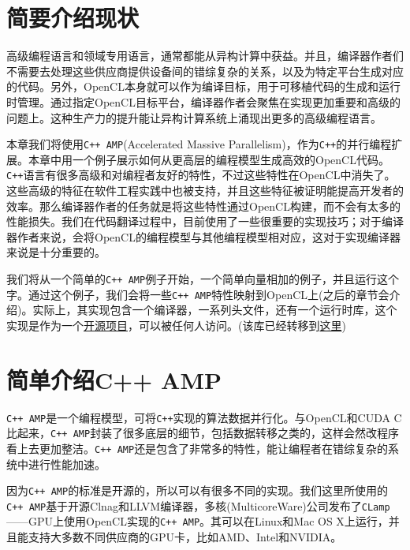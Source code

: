 

\section{简要介绍现状}

高级编程语言和领域专用语言，通常都能从异构计算中获益。并且，编译器作者们不需要去处理这些供应商提供设备间的错综复杂的关系，以及为特定平台生成对应的代码。另外，OpenCL本身就可以作为编译目标，用于可移植代码的生成和运行时管理。通过指定OpenCL目标平台，编译器作者会聚焦在实现更加重要和高级的问题上。这种生产力的提升能让异构计算系统上涌现出更多的高级编程语言。

本章我们将使用\texttt{C++ AMP}(Accelerated Massive Parallelism)，作为\texttt{C++}的并行编程扩展。本章中用一个例子展示如何从更高层的编程模型生成高效的OpenCL代码。\texttt{C++}语言有很多高级和对编程者友好的特性，不过这些特性在OpenCL中消失了。这些高级的特征在软件工程实践中也被支持，并且这些特征被证明能提高开发者的效率。那么编译器作者的任务就是将这些特性通过OpenCL构建，而不会有太多的性能损失。我们在代码翻译过程中，目前使用了一些很重要的实现技巧；对于编译器作者来说，会将OpenCL的编程模型与其他编程模型相对应，这对于实现编译器来说是十分重要的。

我们将从一个简单的\texttt{C++ AMP}例子开始，一个简单向量相加的例子，并且运行这个字。通过这个例子，我们会将一些\texttt{C++ AMP}特性映射到OpenCL上(之后的章节会介绍)。实际上，其实现包含一个编译器，一系列头文件，还有一个运行时库，这个实现是作为一个\href{https://bitbucket.org/multicoreware/cppamp-driver-ng/}{开源项目}，可以被任何人访问。(该库已经转移到\href{https://bitbucket.org/multicoreware/hcc/overview}{这里})



\section{简单介绍C++ AMP}

\texttt{C++ AMP}是一个编程模型，可将\texttt{C++}实现的算法数据并行化。与OpenCL和CUDA C比起来，\texttt{C++ AMP}封装了很多底层的细节，包括数据转移之类的，这样会然改程序看上去更加整洁。\texttt{C++ AMP}还是包含了非常多的特性，能让编程者在错综复杂的系统中进行性能加速。

因为\texttt{C++ AMP}的标准是开源的，所以可以有很多不同的实现。我们这里所使用的\texttt{C++ AMP}基于开源Clnag和LLVM编译器，多核(MulticoreWare)公司发布了\texttt{CLamp}——GPU上使用OpenCL实现的\texttt{C++ AMP}。其可以在Linux和Mac OS X上运行，并且能支持大多数不同供应商的GPU卡，比如AMD、Intel和NVIDIA。

